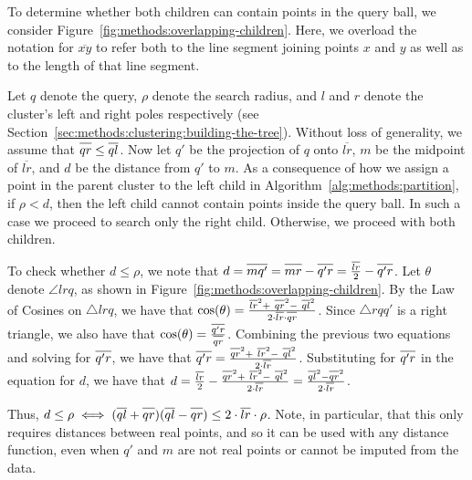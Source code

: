To determine whether both children can contain points in the query ball, we consider Figure~\ref{fig:methods:overlapping-children}.
Here, we overload the notation for $\overline{x y}$ to refer both to the line segment joining points $x$ and $y$ as well as to the length of that line segment.

Let $q$ denote the query, $\rho$ denote the search radius, and $l$ and $r$ denote the cluster's left and right poles respectively (see Section~\ref{sec:methods:clustering:building-the-tree}).
Without loss of generality, we assume that $\overline{q r \vphantom{l}} \leq \overline{q l}$.
Now let $q'$ be the projection of $q$ onto $\overline{l r}$, $m$ be the midpoint of $\overline{l r}$, and $d$ be the distance from $q'$ to $m$.
As a consequence of how we assign a point in the parent cluster to the left child in Algorithm~\ref{alg:methods:partition}, if $\rho < d$, then the left child cannot contain points inside the query ball.
In such a case we proceed to search only the right child.
Otherwise, we proceed with both children.

To check whether $d \leq \rho$, we note that $d = \overline{m q' \vphantom{l}} = \overline{m r \vphantom{l}} - \overline{q' r \vphantom{l}} = \frac{\overline{l r}}{2} - \overline{q' r \vphantom{l}}$.
Let $\theta$ denote $\angle l r q$, as shown in Figure~\ref{fig:methods:overlapping-children}.
By the Law of Cosines on $\triangle l r q$, we have that $\text{cos}(\theta) = \tfrac{\overline{l r}^2 + \ \overline{q r \vphantom{l}}^2 - \ \overline{q l}^2}{2 \cdot \overline{l r} \cdot \overline{q r \vphantom{l}}}$.
Since $\triangle r q q'$ is a right triangle, we also have that $\text{cos}(\theta) = \tfrac{\overline{q' r \vphantom{l}}}{\overline{q r \vphantom{l}}}$.
Combining the previous two equations and solving for $\overline{q' r \vphantom{l}}$, we have that $\overline{q' r \vphantom{l}} = \tfrac{\overline{q r \vphantom{l}}^2 + \ \overline{l r}^2 - \ \overline{q l}^2}{2 \cdot \overline{l r}}$.
Substituting for $\overline{q' r \vphantom{l}}$ in the equation for $d$, we have that $d = \tfrac{\overline{l r}}{2} - \tfrac{\overline{q r \vphantom{l}}^2 + \ \overline{l r}^2 - \ \overline{q l}^2}{2 \cdot \overline{l r}} = \tfrac{\overline{q l}^2 - \overline{q r \vphantom{l}}^2}{2 \cdot \overline{l r}}$.


Thus, $d \leq \rho \iff (\overline{q l} + \overline{q r \vphantom{l}})(\overline{q l} - \overline{q r \vphantom{l}}) \leq 2 \cdot \overline{l r} \cdot \rho$. Note, in particular, that this only requires distances between real points, and so it can be used with any distance function, even when $q'$ and $m$ are not real points or cannot be imputed from the data.

